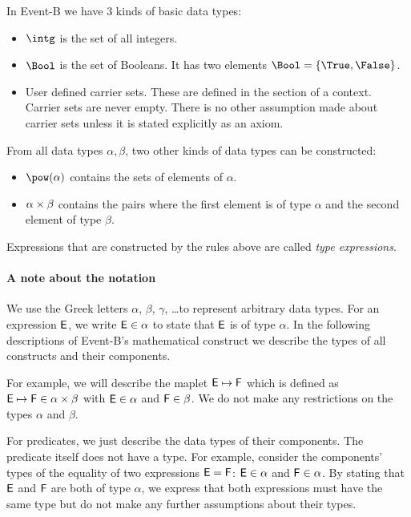 In Event-B we have 3 kinds of basic data types:
\begin{itemize}
\item {} $\intg$ is the set of all integers.
\item {}
  $\Bool$ is the set of Booleans. 
  It has two elements $\Bool = \{\True,\False\}$.
\item {}
  User defined carrier sets. 
  These are defined in the  section of a context.
  Carrier sets are never empty.
  There is no other assumption made about carrier sets unless it is stated explicitly as
  an axiom.
\end{itemize}
From all data types $\alpha, \beta$, two other kinds of data types can be constructed:
\begin{itemize}
\item $\pow(\alpha)$ contains the sets of elements of $\alpha$.
\item {} $\alpha\mathbin\times\beta$ contains the pairs where the first element is of type $\alpha$ and the
  second element of type $\beta$.
\end{itemize}
 Expressions that are constructed by the rules above are called \emph{type expressions}.

\paragraph{A note about the notation}
We use the Greek letters $\alpha$, $\beta$, $\gamma$, \ldots to represent arbitrary data types.
For an expression $\textsf{E}$, we write $\textsf{E}\in\alpha$ to state that $\textsf{E}$ is of type $\alpha$.
In the following descriptions of Event-B's mathematical construct we describe the
  types of all constructs and their components.

For example, we will describe the maplet $\textsf{E}\mapsto \textsf{F}$ which is defined as $\textsf{E}\mapsto \textsf{F}\in\alpha\mathbin\times\beta$ with
 $\textsf{E}\in\alpha$ and $\textsf{F}\in\beta$. We do not make any restrictions on the types $\alpha$ and $\beta$.

For predicates, we just describe the data types of their components. 
The predicate itself does not have a type.
For example, consider the components' types of the equality of two expressions $\textsf{E}=\textsf{F}$: $\textsf{E}\in\alpha$ and $\textsf{F}\in\alpha$.
By stating that $\textsf{E}$ and $\textsf{F}$ are both of type $\alpha$, we express that both expressions must have the
  same type but do not make any further assumptions about their types.

